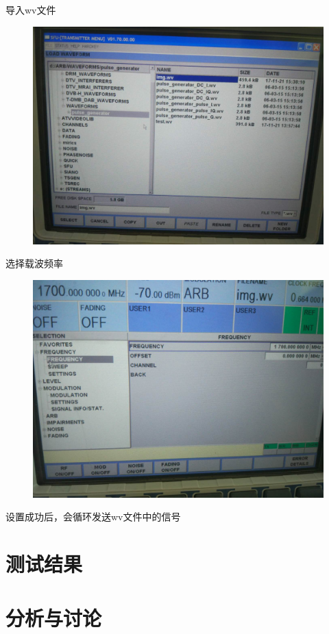 \documentclass[UTF8]{ctexart}
\begin{document}
导入wv文件

\begin{figure}[H]
        \centering
        \includegraphics[width=\textwidth]{images//loadwv.jpg}
\end{figure}

选择载波频率

\begin{figure}[H]
        \centering
        \includegraphics[width=\textwidth]{images//setfreq.jpg}
\end{figure}

设置成功后，会循环发送wv文件中的信号

\section{测试结果}

\section{分析与讨论}
\end{document}
